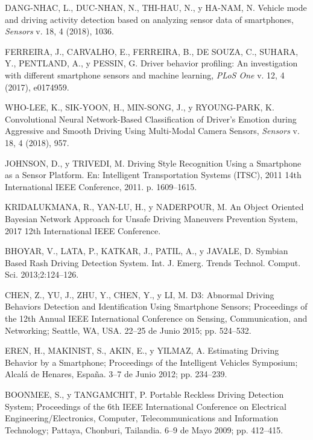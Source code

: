 
\begin{thebibliography}{9}
DANG-NHAC, L., DUC-NHAN, N., THI-HAU, N., y HA-NAM, N. Vehicle mode and driving activity detection based on analyzing sensor data of smartphones, \textit{Sensors} v. 18, 4 (2018), 1036.

FERREIRA, J., CARVALHO, E., FERREIRA, B., DE SOUZA, C., SUHARA, Y., PENTLAND, A., y PESSIN, G. Driver behavior profiling: An investigation with different smartphone sensors and machine learning, \textit{PLoS One} v. 12, 4 (2017), e0174959.

WHO-LEE, K., SIK-YOON, H., MIN-SONG, J., y RYOUNG-PARK, K. Convolutional Neural Network-Based Classification of Driver’s Emotion during Aggressive and Smooth Driving Using Multi-Modal Camera Sensors, \textit{Sensors} v. 18, 4 (2018), 957.

JOHNSON, D., y TRIVEDI, M. Driving Style Recognition Using a Smartphone as a Sensor Platform. En: Intelligent Transportation Systems (ITSC), 2011 14th International IEEE Conference, 2011. p. 1609–1615.

KRIDALUKMANA, R., YAN-LU, H., y NADERPOUR, M. An Object Oriented Bayesian Network Approach for Unsafe Driving Maneuvers Prevention System, 2017 12th International IEEE Conference.

BHOYAR, V., LATA, P., KATKAR, J., PATIL, A., y JAVALE, D. Symbian Based Rash Driving Detection System. Int. J. Emerg. Trends Technol. Comput. Sci. 2013;2:124–126.

CHEN, Z., YU, J., ZHU, Y., CHEN, Y., y LI, M. D3: Abnormal Driving Behaviors Detection and Identification Using Smartphone Sensors; Proceedings of the 12th Annual IEEE International Conference on Sensing, Communication, and Networking; Seattle, WA, USA. 22–25 de Junio 2015; pp. 524–532.

EREN, H., MAKINIST, S., AKIN, E., y YILMAZ, A. Estimating Driving Behavior by a Smartphone; Proceedings of the Intelligent Vehicles Symposium; Alcalá de Henares, Espa\~{n}a. 3–7 de Junio 2012; pp. 234–239.

BOONMEE, S., y TANGAMCHIT, P. Portable Reckless Driving Detection System; Proceedings of the 6th IEEE International Conference on Electrical Engineering/Electronics, Computer, Telecommunications and Information Technology; Pattaya, Chonburi, Tailandia. 6–9 de Mayo 2009; pp. 412–415.


\end{thebibliography}
